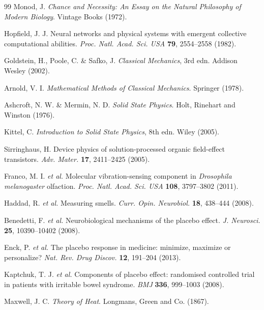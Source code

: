 \documentclass{article}
\theoremstyle{definition}
\theoremstyle{remark}
\begin{document}
\begin{thebibliography}{99}
Monod, J.
\newblock \emph{Chance and Necessity: An Essay on the Natural Philosophy of Modern Biology}.
\newblock Vintage Books (1972).

Hopfield, J. J.
\newblock Neural networks and physical systems with emergent collective computational abilities.
\newblock \emph{Proc. Natl. Acad. Sci. USA} \textbf{79}, 2554--2558 (1982).

Goldstein, H., Poole, C. \& Safko, J.
\newblock \emph{Classical Mechanics}, 3rd edn.
\newblock Addison Wesley (2002).

Arnold, V. I.
\newblock \emph{Mathematical Methods of Classical Mechanics}.
\newblock Springer (1978).

Ashcroft, N. W. \& Mermin, N. D.
\newblock \emph{Solid State Physics}.
\newblock Holt, Rinehart and Winston (1976).

Kittel, C.
\newblock \emph{Introduction to Solid State Physics}, 8th edn.
\newblock Wiley (2005).

Sirringhaus, H.
\newblock Device physics of solution-processed organic field-effect transistors.
\newblock \emph{Adv. Mater.} \textbf{17}, 2411--2425 (2005).

Franco, M. I. \emph{et al.}
\newblock Molecular vibration-sensing component in \emph{Drosophila melanogaster} olfaction.
\newblock \emph{Proc. Natl. Acad. Sci. USA} \textbf{108}, 3797--3802 (2011).

Haddad, R. \emph{et al.}
\newblock Measuring smells.
\newblock \emph{Curr. Opin. Neurobiol.} \textbf{18}, 438--444 (2008).

Benedetti, F. \emph{et al.}
\newblock Neurobiological mechanisms of the placebo effect.
\newblock \emph{J. Neurosci.} \textbf{25}, 10390--10402 (2008).

Enck, P. \emph{et al.}
\newblock The placebo response in medicine: minimize, maximize or personalize?
\newblock \emph{Nat. Rev. Drug Discov.} \textbf{12}, 191--204 (2013).

Kaptchuk, T. J. \emph{et al.}
\newblock Components of placebo effect: randomised controlled trial in patients with irritable bowel syndrome.
\newblock \emph{BMJ} \textbf{336}, 999--1003 (2008).

Maxwell, J. C.
\newblock \emph{Theory of Heat}.
\newblock Longmans, Green and Co. (1867).


\end{thebibliography}
\end{document}
